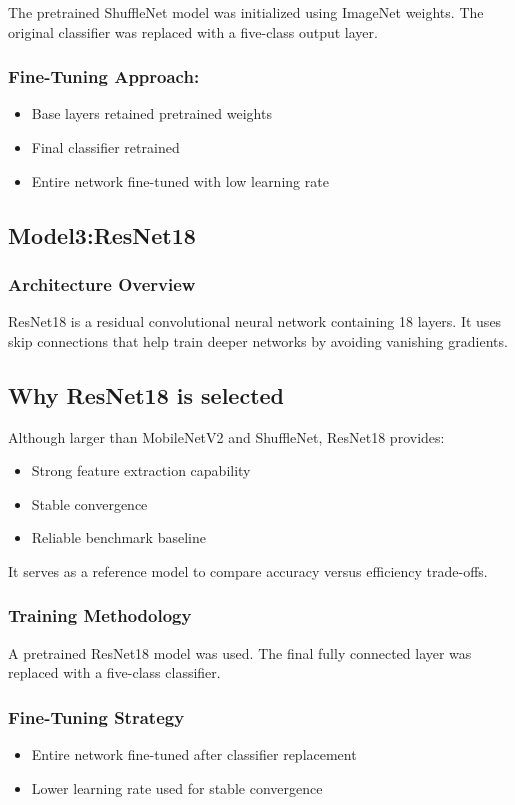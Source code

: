 The pretrained ShuffleNet model was initialized using ImageNet weights. The original classifier was replaced with a five-class output layer.

\subsubsection{Fine-Tuning Approach:}
\begin{itemize}
\item Base layers retained pretrained weights
\item Final classifier retrained
\item Entire network fine-tuned with low learning rate
\end{itemize}

\subsection{Model3:ResNet18 }
\subsubsection{Architecture Overview}

ResNet18 is a residual convolutional neural network containing 18 layers. It uses skip connections that help train deeper networks by avoiding vanishing gradients.

\subsection{Why ResNet18 is selected}

Although larger than MobileNetV2 and ShuffleNet, ResNet18 provides:
\begin{itemize}
\item Strong feature extraction capability
\item Stable convergence
\item Reliable benchmark baseline
\end{itemize}
It serves as a reference model to compare accuracy versus efficiency trade-offs.

\subsubsection{Training Methodology}

A pretrained ResNet18 model was used. The final fully connected layer was replaced with a five-class classifier.

\subsubsection{Fine-Tuning Strategy}
\begin{itemize}
\item Entire network fine-tuned after classifier replacement
\item Lower learning rate used for stable convergence
\end{itemize}

